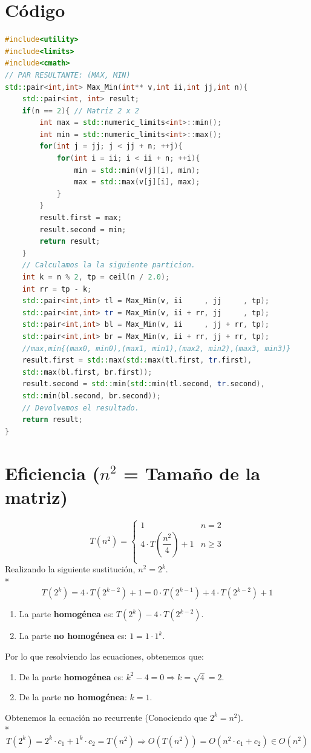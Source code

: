 \documentclass[12pt,a4paper]{report}
\begin{document}
	\section{Código}
	\begin{lstlisting}[language=c++]
#include<utility>
#include<limits>
#include<cmath>
// PAR RESULTANTE: (MAX, MIN)
std::pair<int,int> Max_Min(int** v,int ii,int jj,int n){
	std::pair<int, int> result;
	if(n == 2){ // Matriz 2 x 2
		int max = std::numeric_limits<int>::min();
		int min = std::numeric_limits<int>::max();
		for(int j = jj; j < jj + n; ++j){
			for(int i = ii; i < ii + n; ++i){
				min = std::min(v[j][i], min);
				max = std::max(v[j][i], max);
			}
		}
		result.first = max;
		result.second = min;
		return result;
	}
	// Calculamos la la siguiente particion.
	int k = n % 2, tp = ceil(n / 2.0);
	int rr = tp - k;
	std::pair<int,int> tl = Max_Min(v, ii     , jj     , tp);
	std::pair<int,int> tr = Max_Min(v, ii + rr, jj     , tp);
	std::pair<int,int> bl = Max_Min(v, ii     , jj + rr, tp);
	std::pair<int,int> br = Max_Min(v, ii + rr, jj + rr, tp);
	//max,min{(max0, min0),(max1, min1),(max2, min2),(max3, min3)}
	result.first = std::max(std::max(tl.first, tr.first),
	std::max(bl.first, br.first));
	result.second = std::min(std::min(tl.second, tr.second),
	std::min(bl.second, br.second));
	// Devolvemos el resultado.
	return result;
}
		\end{lstlisting}
		\newpage
		\section{Eficiencia ($n^2$ = Tamaño de la matriz)}
		\[   
			T(n^2) = 
			\begin{cases}
			1 & n = 2\\
			4\cdot T\left(\dfrac{n^2}{4}\right) + 1 & n \ge 3 \\
			\end{cases}
		\]
		Realizando la siguiente sustitución, $n^2=2^k$.\\*
		$$T(2^k)=4\cdot T(2^{k-2}) + 1=0\cdot T(2^{k-1}) + 4\cdot T(2^{k-2}) + 1$$
		\begin{enumerate}
			\item La parte \textbf{homogénea} es: $T(2^k) - 4\cdot T(2^{k-2})$.
			\item La parte \textbf{no homogénea} es: $1=1\cdot 1^k$.
		\end{enumerate}
		Por lo que resolviendo las ecuaciones, obtenemos que:
		\begin{enumerate}
			\item De la parte \textbf{homogénea} es: $k^2-4=0\Rightarrow k=\sqrt{4}=2$.
			\item De la parte \textbf{no homogénea}: $k=1$.
		\end{enumerate}
		Obtenemos la ecuación no recurrente (Conociendo que $2^k = n^2$).\\*
		$$T(2^k)=2^k\cdot c_1+1^k\cdot c_2=T(n^2)\Rightarrow O(T(n^2))=O(n^2\cdot c_1 + c_2)\in O(n^2)$$
\end{document}
